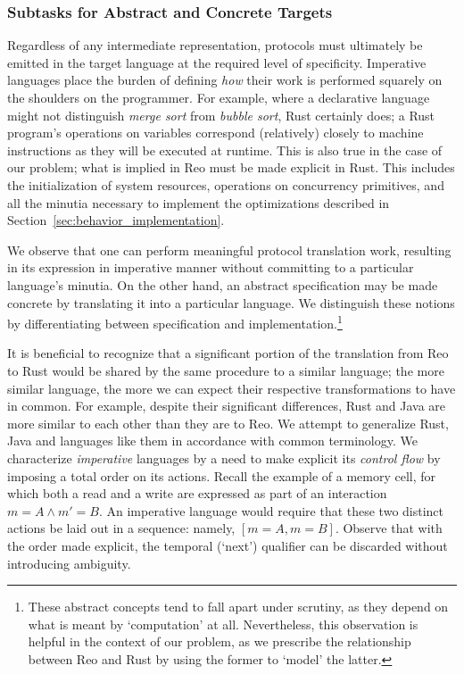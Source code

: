 \subsubsection{Subtasks for Abstract and Concrete Targets}
Regardless of any intermediate representation, protocols must ultimately be emitted in the target language at the required level of specificity. Imperative languages place the burden of defining \textit{how} their work is performed squarely on the shoulders on the programmer. For example, where a declarative language might not distinguish \textit{merge sort} from \textit{bubble sort}, Rust certainly does; a Rust program's operations on variables correspond (relatively) closely to machine instructions as they will be executed at runtime. This is also true in the case of our problem; what is implied in Reo must be made explicit in Rust. This includes the initialization of system resources, operations on concurrency primitives, and all the minutia necessary to implement the optimizations described in Section~\ref{sec:behavior_implementation}. 

We observe that one can perform meaningful protocol translation work, resulting in its expression in imperative manner without committing to a particular language's minutia. On the other hand, an abstract specification may be made concrete by translating it into a particular language. We distinguish these notions by differentiating between specification and implementation.\footnote{These abstract concepts tend to fall apart under scrutiny, as they depend on what is meant by `computation' at all. Nevertheless, this observation is helpful in the context of our problem, as we prescribe the relationship between Reo and Rust by using the former to `model' the latter.}  

It is beneficial to recognize that a significant portion of the translation from Reo to Rust would be shared by the same procedure to a similar language; the more similar language, the more we can expect their respective transformations to have in common. For example, despite their significant differences, Rust and Java are more similar to each other than they are to Reo. We attempt to generalize Rust, Java and languages like them in accordance with common terminology. We characterize \textit{imperative} languages by a need to make explicit its \textit{control flow} by imposing a total order on its actions. Recall the example of a memory cell, for which both a read and a write are expressed as part of an interaction $m=A\wedge{}m'=B$. An imperative language would require that these two distinct actions be laid out in a sequence: namely, $[m=A, m=B]$. Observe that with the order made explicit, the temporal (`next') qualifier can be discarded without introducing ambiguity.

